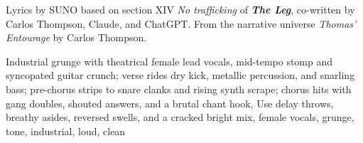 
\begin{notes}
Lyrics by SUNO based on section XIV \emph{No trafficking} of \emph{\bfseries The Leg}, %
co-written by Carlos Thompson, Claude, and ChatGPT. %
From the narrative universe \emph{Thomas’ Entourage} by Carlos Thompson.
\end{notes}
\begin{style}
Industrial grunge with theatrical female lead vocals, mid-tempo stomp and syncopated guitar crunch; verse rides dry kick, metallic percussion, and snarling bass; pre-chorus strips to snare clanks and rising synth scrape; chorus hits with gang doubles, shouted answers, and a brutal chant hook, Use delay throws, breathy asides, reversed swells, and a cracked bright mix, female vocals, grunge, tone, industrial, loud, clean
\end{style}
